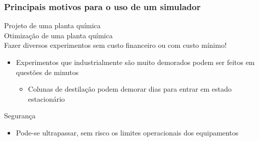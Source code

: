 \documentclass[aspectratio=169]{beamer}
\begin{document}
\begin{frame}
	\frametitle{Principais motivos para o uso de um simulador}
	Projeto de uma planta química\\
	Otimização de uma planta química\\
	Fazer diversos experimentos sem custo financeiro ou com custo mínimo!
	\begin{itemize}
		\item Experimentos que industrialmente são muito demorados podem ser feitos em
		questões de minutos
			\begin{itemize}
				\item Colunas de destilação podem demorar dias para entrar
				em estado estacionário
		\end{itemize}
	\end{itemize}
	Segurança
	\begin{itemize}
		\item Pode-se ultrapassar, sem risco os limites operacionais dos equipamentos
	\end{itemize}
\end{frame}

\begin{frame}
	\frametitle{}
\end{frame}
 
 
 
 
 
 
 
 
 
 
 
 
 
 
 
 
 
 
 
 
 
 
 
 
 
 
 
 
 
 
 
 
 
 
 
 
 
 
 
\end{document}
